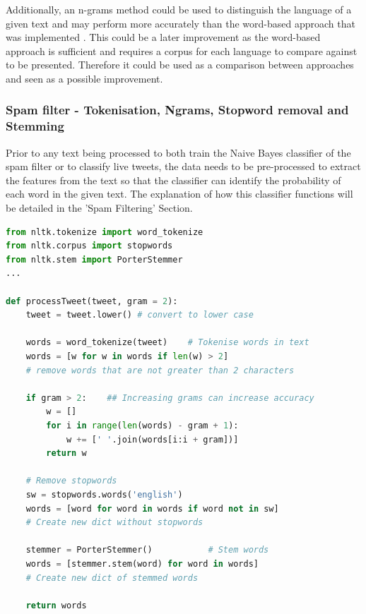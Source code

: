 \documentclass[oneside, 12pt]{article}
\begin{document}
			Additionally, an n-grams method could be used to distinguish the language of a given text and may perform more accurately than the word-based approach that was implemented \cite{39}. This could be a later improvement as the word-based approach is sufficient and requires a corpus for each language to compare against to be presented. Therefore it could be used as a comparison between approaches and seen as a possible improvement.
			
			\subsubsection{Spam filter - Tokenisation, Ngrams, Stopword removal and Stemming}
			
			Prior to any text being processed to both train the Naive Bayes classifier of the spam filter or to classify live tweets, the data needs to be pre-processed to extract the features from the text so that the classifier can identify the probability of each word in the given text. The explanation of how this classifier functions will be detailed in the 'Spam Filtering' Section.
			
			\begin{lstlisting}[language=python, caption=pre-processing of data prior to being used by the spam filter]
from nltk.tokenize import word_tokenize
from nltk.corpus import stopwords
from nltk.stem import PorterStemmer
...
			
def processTweet(tweet, gram = 2):
	tweet = tweet.lower() # convert to lower case
				
	words = word_tokenize(tweet)    # Tokenise words in text
	words = [w for w in words if len(w) > 2]  
	# remove words that are not greater than 2 characters
				
	if gram > 2:    ## Increasing grams can increase accuracy
		w = []
		for i in range(len(words) - gram + 1):
			w += [' '.join(words[i:i + gram])]
		return w
				
	# Remove stopwords
	sw = stopwords.words('english')
	words = [word for word in words if word not in sw]
	# Create new dict without stopwords
				
	stemmer = PorterStemmer()           # Stem words
	words = [stemmer.stem(word) for word in words]
	# Create new dict of stemmed words
				
	return words
			\end{lstlisting}
			
\end{document}
